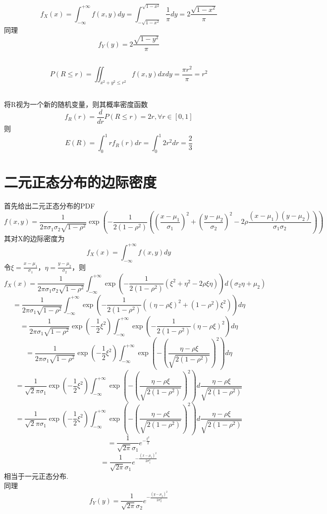 \documentclass{article}
\begin{document}
\begin{CJK}{UTF8}{gbsn}
\subsection{}
$$ f_{X}(x)=\int_{-\infty}^{+\infty}f(x,y)dy=\int_{-\sqrt{1-x^{2}}}^{\sqrt{1-x^{2}}}\frac{1}{\pi}dy=2\frac{\sqrt{1-x^{2}}}{\pi}$$
同理
$$ f_{Y}(y)=2\frac{\sqrt{1-y^{2}}}{\pi} $$
\subsection{}
$$P(R\leq r)=\iint_{x^{2}+y^{2}\leq r^{2}}f(x,y)dxdy=\frac{\pi r^{2}}{\pi}=r^{2}$$
\subsection{}
将R视为一个新的随机变量，则其概率密度函数
$$f_{R}(r)=\frac{d}{dr}P(R\leq r)=2r,\forall r\in [0,1]$$
则
$$ E(R)=\int_{0}^{1}rf_{R}(r)dr=\int_{0}^{1}2r^{2}dr=\frac{2}{3}$$
\section{二元正态分布的边际密度}
首先给出二元正态分布的PDF
$$ f(x,y)=\frac{1}{2\pi\sigma_{1}\sigma_{2}\sqrt{1-\rho^{2}}}\exp{(-\frac{1}{2(1-\rho^{2})}((\frac{x-\mu_{1}}{\sigma_{1}})^{2}+(\frac{y-\mu_{2}}{\sigma_{2}})^{2}-2\rho\frac{(x-\mu_{1})(y-\mu_{2})}{\sigma_{1}\sigma_{2}}))}$$
其对X的边际密度为
$$ f_{X}(x)=\int_{-\infty}^{+\infty}f(x,y)dy$$
令$\xi=\frac{x-\mu_{1}}{\sigma_{1}}$，$\eta=\frac{y-\mu_{2}}{\sigma_{2}}$，则
$$ f_{X}(x)=\frac{1}{2\pi\sigma_{1}\sigma_{2}\sqrt{1-\rho^{2}}}\int_{-\infty}^{+\infty}\exp{(-\frac{1}{2(1-\rho^{2})}(\xi^{2}+\eta^{2}-2\rho\xi\eta))}d(\sigma_{2}\eta+\mu_{2})$$
$$ =\frac{1}{2\pi\sigma_{1}\sqrt{1-\rho^{2}}}\int_{-\infty}^{+\infty}\exp{(-\frac{1}{2(1-\rho^{2})}((\eta-\rho\xi)^{2}+(1-\rho^{2})\xi^{2}))}d\eta$$
$$ =\frac{1}{2\pi\sigma_{1}\sqrt{1-\rho^{2}}}\exp(-\frac{1}{2}\xi^{2})\int_{-\infty}^{+\infty}\exp{(-\frac{1}{2(1-\rho^{2})}(\eta-\rho\xi)^{2})}d\eta$$
$$ =\frac{1}{2\pi\sigma_{1}\sqrt{1-\rho^{2}}}\exp(-\frac{1}{2}\xi^{2})\int_{-\infty}^{+\infty}\exp{(-(\frac{\eta-\rho\xi}{\sqrt{2(1-\rho^{2})}})^{2})}d\eta$$
$$ =\frac{1}{\sqrt{2}\pi\sigma_{1}}\exp(-\frac{1}{2}\xi^{2})\int_{-\infty}^{+\infty}\exp{(-(\frac{\eta-\rho\xi}{\sqrt{2(1-\rho^{2})}})^{2})}d\frac{\eta-\rho\xi}{\sqrt{2(1-\rho^{2})}}$$
$$ =\frac{1}{\sqrt{2}\pi\sigma_{1}}\exp(-\frac{1}{2}\xi^{2})\int_{-\infty}^{+\infty}\exp{(-(\frac{\eta-\rho\xi}{\sqrt{2(1-\rho^{2})}})^{2})}d\frac{\eta-\rho\xi}{\sqrt{2(1-\rho^{2})}}$$
$$ =\frac{1}{\sqrt{2\pi}\sigma_{1}}e^{-\frac{\xi^{2}}{2}}$$
$$ =\frac{1}{\sqrt{2\pi}\sigma_{1}}e^{-\frac{(x-\mu_{1})^{2}}{2\sigma_{1}^{2}}}$$
相当于一元正态分布.
\\同理
$$ f_{Y}(y)=\frac{1}{\sqrt{2\pi}\sigma_{2}}e^{-\frac{(y-\mu_2)^{2}}{2\sigma_{2}^{2}}}$$

\end{CJK}
\end{document}
